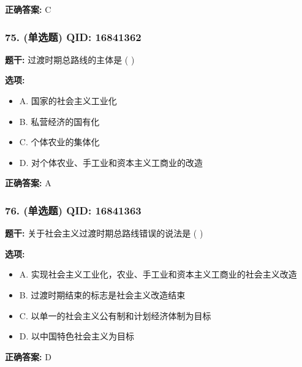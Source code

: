 \documentclass[12pt,UTF8]{ctexart}
\begin{document}
\textbf{正确答案:}
C

\vspace{0.3em}\hrulefill\vspace{0.7em}

\subsubsection*{75. (单选题) \small QID: 16841362}

\textbf{题干:}
过渡时期总路线的主体是 ( )

\textbf{选项:}
\begin{itemize}[leftmargin=*]

  \item A. 国家的社会主义工业化

  \item B. 私营经济的国有化

  \item C. 个体农业的集体化

  \item D. 对个体农业、手工业和资本主义工商业的改造

\end{itemize}

\textbf{正确答案:}
A

\vspace{0.3em}\hrulefill\vspace{0.7em}

\subsubsection*{76. (单选题) \small QID: 16841363}

\textbf{题干:}
关于社会主义过渡时期总路线错误的说法是 ( )

\textbf{选项:}
\begin{itemize}[leftmargin=*]

  \item A. 实现社会主义工业化，农业、手工业和资本主义工商业的社会主义改造

  \item B. 过渡时期结束的标志是社会主义改造结束

  \item C. 以单一的社会主义公有制和计划经济体制为目标

  \item D. 以中国特色社会主义为目标

\end{itemize}

\textbf{正确答案:}
D
\end{document}
